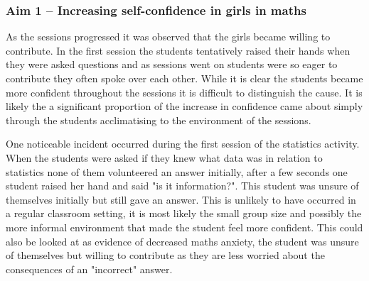 \documentclass[11pt, a4paper, notitlepage]{article}
\begin{document}
\subsubsection*{Aim 1 -- Increasing self-confidence in girls in maths}
As the sessions progressed it was observed that the girls became willing to contribute. In the first session the students tentatively raised their hands when they were asked questions and as sessions went on students were so eager to contribute they often spoke over each other. While it is clear the students became more confident throughout the sessions it is difficult to distinguish the cause. It is likely the a significant proportion of the increase in confidence came about simply through the students acclimatising to the environment of the sessions.
\par
One noticeable incident occurred during the first session of the statistics activity. When the students were asked if they knew what data was in relation to statistics none of them volunteered an answer initially, after a few seconds one student raised her hand and said "is it information?". This student was unsure of themselves initially but still gave an answer. This is unlikely to have occurred in a regular classroom setting, it is most likely the small group size and possibly the more informal environment that made the student feel more confident. This could also be looked at as evidence of decreased maths anxiety, the student was unsure of themselves but willing to contribute as they are less worried about the consequences of an "incorrect" answer.
\end{document}
